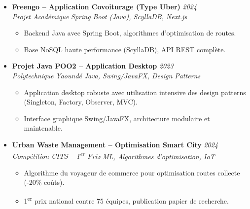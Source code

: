 \documentclass[a4paper,11pt]{article}
\begin{document}
\begin{itemize}[leftmargin=*, label={-}]
\item \textbf{Freengo -- Application Covoiturage (Type Uber)} \hfill \textit{2024} \\
\textit{Projet Académique} \hfill \textit{Spring Boot (Java), ScyllaDB, Next.js}
\vspace{-2pt}
    \begin{itemize}[leftmargin=0.4cm, nosep, label=\tiny$\bullet$]
        \item \small{Backend Java avec Spring Boot, algorithmes d'optimisation de routes.}
        \item \small{Base NoSQL haute performance (ScyllaDB), API REST complète.}
    \end{itemize}
\vspace{3pt}

\item \textbf{Projet Java POO2 -- Application Desktop} \hfill \textit{2023} \\
\textit{Polytechnique Yaoundé} \hfill \textit{Java, Swing/JavaFX, Design Patterns}
\vspace{-2pt}
    \begin{itemize}[leftmargin=0.4cm, nosep, label=\tiny$\bullet$]
        \item \small{Application desktop robuste avec utilisation intensive des design patterns (Singleton, Factory, Observer, MVC).}
        \item \small{Interface graphique Swing/JavaFX, architecture modulaire et maintenable.}
    \end{itemize}
\vspace{3pt}

\item \textbf{Urban Waste Management -- Optimisation Smart City} \hfill \textit{2024} \\
\textit{Compétition CITS -- 1\textsuperscript{er} Prix} \hfill \textit{ML, Algorithmes d'optimisation, IoT}
\vspace{-2pt}
    \begin{itemize}[leftmargin=0.4cm, nosep, label=\tiny$\bullet$]
        \item \small{Algorithme du voyageur de commerce pour optimisation routes collecte (-20\% coûts).}
        \item \small{1\textsuperscript{er} prix national contre 75 équipes, publication papier de recherche.}
    \end{itemize}
\vspace{3pt}

\end{itemize}
\end{document}
